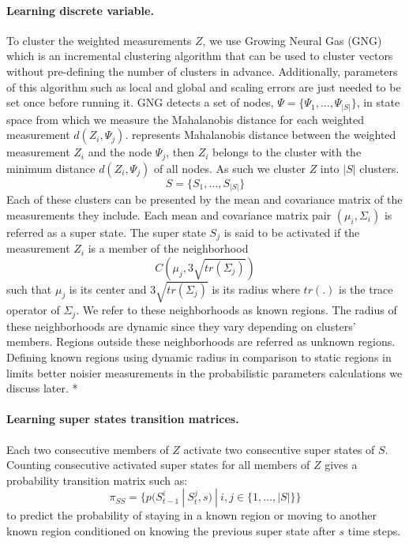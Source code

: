 \documentclass{article}
\newcommand\tdoo[1]{ * \textcolor{red}{#1}}
\begin{document}
\begin{multicols}{2}
    \paragraph{Learning discrete variable.} To cluster the weighted measurements $Z$, we use Growing Neural Gas (GNG) \cite{fritzke-1995-a-growing-neural-gas-network-learns-topologies}  which is an incremental clustering algorithm that can be used to cluster vectors without pre-defining the number of clusters in advance. Additionally, parameters of this algorithm such as local and global and scaling errors are just needed to be set once before running it. GNG detects a set of nodes, $\Psi = \{\Psi_1,...,\Psi_{|S|}\}$, in state space from which we measure the Mahalanobis distance for each weighted measurement $d(Z_i,\Psi_j)$. represents Mahalanobis distance between the weighted measurement $Z_i$ and the node $\Psi_j$, then $Z_i$ belongs to the cluster with the minimum distance $d(Z_i, \Psi_j)$ of all nodes. As such we cluster $Z$ into $|S|$ clusters.
    \begin{equation}
        S=\{S_1,\dots,S_{|S|}\}
        \label{eq:super-states}
    \end{equation}
    Each of these clusters can be presented by the mean and covariance matrix of the measurements they include. Each mean and covariance matrix pair $(\mu_i,\Sigma_i)$ is referred as a super state. The super state $S_j$ is said to be activated if the measurement $Z_i$ is a member of the neighborhood
    \begin{equation}
        C(\mu_j, 3\sqrt{tr(\Sigma_j)})
    \end{equation}
    such that $\mu_j$ is its center and $3\sqrt{tr(\Sigma_j)}$ is its radius where $tr(.)$ is the trace operator of $\Sigma_j$. We refer to these neighborhoods as known regions. The radius of these neighborhoods are dynamic since they vary depending on clusters' members. Regions outside these neighborhoods  are referred as unknown regions. Defining known regions using dynamic radius in comparison to static regions in \cite{baydoun-2018-learning-switching-models-for-abnormality-detection-for-autonomous-driving} limits better noisier measurements in the probabilistic parameters calculations we discuss later.\tdoo{}

    \paragraph{Learning super states transition matrices.} Each two consecutive members of $Z$ activate two consecutive super states of $S$. Counting consecutive activated super states for all members of $Z$ gives a probability transition matrix such as:
    \begin{equation}
        \pi_{SS} = \{p(S^i_{t-1} \ | \ S^j_{t},s) \ | \ i,j \in \{1,\dots,|S|\}\}
        \label{eq:superstate-transition-matrix}
    \end{equation}
    to predict the probability of staying in a known region or moving to another known region conditioned on knowing the previous super state after $s$ time steps.
        

\end{multicols}
\end{document}
